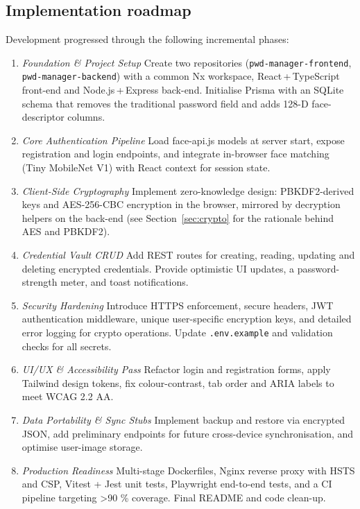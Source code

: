 \subsection{Implementation roadmap}
Development progressed through the following incremental phases:

\begin{enumerate}[label=\textbf{Phase~\arabic*:}, leftmargin=2.8em]

  \item \emph{Foundation \& Project Setup}  
        Create two repositories (\texttt{pwd-manager-frontend}, \texttt{pwd-manager-backend}) with a common Nx
        workspace, React\,+\,TypeScript front-end and Node.js\,+\,Express back-end.
        Initialise Prisma with an SQLite schema that removes the traditional password field
        and adds 128-D face-descriptor columns.

  \item \emph{Core Authentication Pipeline}  
        Load face-api.js models at server start, expose registration and login endpoints, and
        integrate in-browser face matching (Tiny MobileNet V1) with React context for
        session state.

  \item \emph{Client-Side Cryptography}  
        Implement zero-knowledge design: PBKDF2-derived keys and AES-256-CBC encryption
        in the browser, mirrored by decryption helpers on the back-end
        (see Section~\ref{sec:crypto} for the rationale behind AES and PBKDF2).

  \item \emph{Credential Vault CRUD}  
        Add REST routes for creating, reading, updating and deleting encrypted credentials.
        Provide optimistic UI updates, a password-strength meter, and toast notifications.

  \item \emph{Security Hardening}  
        Introduce HTTPS enforcement, secure headers, JWT authentication middleware,
        unique user-specific encryption keys, and detailed error logging for crypto
        operations.  Update \texttt{.env.example} and validation checks for all secrets.

  \item \emph{UI/UX \& Accessibility Pass}  
        Refactor login and registration forms, apply Tailwind design tokens, fix colour-contrast,
        tab order and ARIA labels to meet WCAG 2.2 AA.

  \item \emph{Data Portability \& Sync Stubs}  
        Implement backup and restore via encrypted JSON, add preliminary endpoints for
        future cross-device synchronisation, and optimise user-image storage.

  \item \emph{Production Readiness}  
        Multi-stage Dockerfiles, Nginx reverse proxy with HSTS and CSP, Vitest + Jest unit
        tests, Playwright end-to-end tests, and a CI pipeline targeting \textgreater90 \% coverage.
        Final README and code clean-up.

\end{enumerate}



